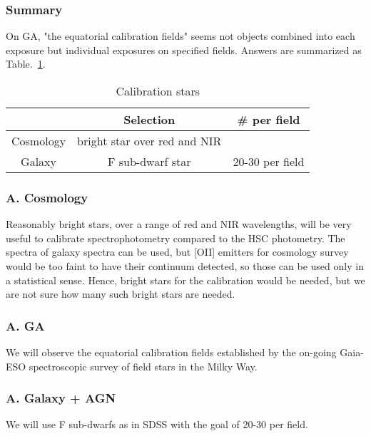\documentclass[a4paper,notitlepage]{article}
\begin{document}
\subsubsection{Summary}

On GA, "the equatorial calibration fields" seems not objects combined into 
each exposure but individual exposures on specified fields. 
Answers are summarized as Table.~\ref{tab:sciops-scireq-calibstar}.

\begin{table}[htb]
\begin{center}
\caption{Calibration stars}
\label{tab:sciops-scireq-calibstar}
\begin{tabular}{c|c|c}
  & Selection & \# per field \\
\hline
Cosmology & bright star over red and NIR &  \\
Galaxy    & F sub-dwarf star & 20-30 per field \\
\end{tabular}
\end{center}
\end{table}


\subsubsection{A. Cosmology}

 Reasonably bright stars, over a range of red and NIR wavelengths,
will be very useful to calibrate spectrophotometry compared to the HSC
photometry. The spectra of galaxy spectra can be used, but [OII]
emitters for cosmology survey would be too faint to have their
continuum detected, so those can be used only in a statistical
sense. Hence, bright stars for the calibration would be needed, but we
are not sure how many such bright stars are needed.

\subsubsection{A. GA}
We will observe the equatorial calibration fields established by
the on-going Gaia-ESO spectroscopic survey of field stars in the Milky
Way.

\subsubsection{A. Galaxy + AGN}

We will use F sub-dwarfs as in SDSS with the goal of 20-30 
per field.
\end{document}
